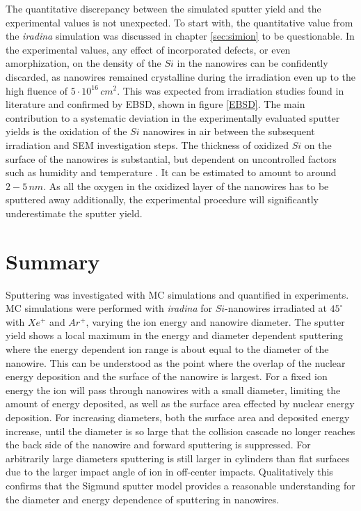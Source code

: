 The quantitative discrepancy between the simulated sputter yield and the experimental values is not unexpected. To start with, the quantitative value from the \emph{iradina} simulation was discussed in chapter \ref{sec:simion} to be questionable. In the experimental values, any effect of incorporated defects, or even amorphization, on the density of the $Si$ in the nanowires can be confidently discarded, as nanowires remained crystalline during the irradiation even up to the high fluence of $5\cdot 10^{16}\,cm^2$. This was expected from irradiation studies found in literature \cite{pelaz_ion-beam-induced_2004} and confirmed by EBSD, shown in figure \ref{EBSD}. The main contribution to a systematic deviation in the experimentally evaluated sputter yields is the oxidation of the $Si$ nanowires in air between the subsequent irradiation and SEM investigation steps. The thickness of oxidized $Si$ on the surface of the nanowires is substantial, but dependent on uncontrolled factors such as humidity and temperature \cite{lukes_oxidation_1972,al-bayati_composition_1991}. It can be estimated to amount to around $2-5\,nm$. As all the oxygen in the oxidized layer of the nanowires has to be sputtered away additionally, the experimental procedure will significantly underestimate the sputter yield.





\section{Summary}

Sputtering was investigated with MC simulations and quantified in experiments. MC simulations were performed with \emph{iradina} for $Si$-nanowires irradiated at $45^\circ$ with $Xe^+$ and $Ar^+$, varying the ion energy and nanowire diameter. The sputter yield shows a local maximum in the energy and diameter dependent sputtering where the energy dependent ion range is about equal to the diameter of the nanowire. This can be understood as the point where the overlap of the nuclear energy deposition and the surface of the nanowire is largest. For a fixed ion energy the ion will pass through nanowires with a small diameter, limiting the amount of energy deposited, as well as the surface area effected by nuclear energy deposition. For increasing diameters, both the surface area and deposited energy increase, until the diameter is so large that the collision cascade no longer reaches the back side of the nanowire and forward sputtering is suppressed. For arbitrarily large diameters sputtering is still larger in cylinders than flat surfaces due to the larger impact angle of ion in off-center impacts. Qualitatively this confirms that the Sigmund sputter model provides a reasonable understanding for the diameter and energy dependence of sputtering in nanowires.
 
